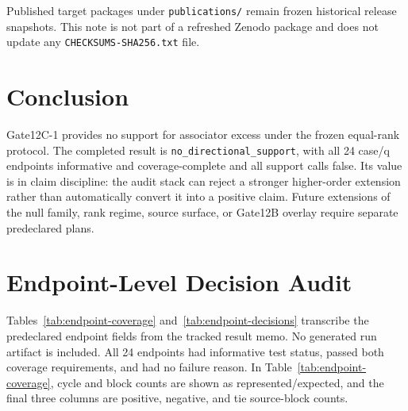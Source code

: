 \documentclass[11pt]{article}
\newcommand{\breakcode}[1]{\begingroup\urlstyle{tt}\nolinkurl{#1}\endgroup}
\begin{document}
Published target packages under \breakcode{publications/} remain frozen
historical release snapshots. This note is not part of a refreshed Zenodo
package and does not update any \breakcode{CHECKSUMS-SHA256.txt} file.

\section{Conclusion}
\label{sec:conclusion}

Gate12C-1 provides no support for associator excess under the frozen equal-rank
protocol. The completed result is \breakcode{no_directional_support}, with all 24
case/q endpoints informative and coverage-complete and all support calls false.
Its value is in claim discipline: the audit stack can reject a stronger
higher-order extension rather than automatically convert it into a positive
claim. Future extensions of the null family, rank regime, source surface, or
Gate12B overlay require separate predeclared plans.

\appendix

\section{Endpoint-Level Decision Audit}
\label{app:endpoint-audit}

Tables~\ref{tab:endpoint-coverage} and~\ref{tab:endpoint-decisions} transcribe
the predeclared endpoint fields from the tracked result memo. No generated run
artifact is included. All 24 endpoints had informative test status, passed both
coverage requirements, and had no failure reason. In
Table~\ref{tab:endpoint-coverage}, cycle and block counts are shown as
represented/expected, and the final three columns are positive, negative, and
tie source-block counts.
\end{document}

